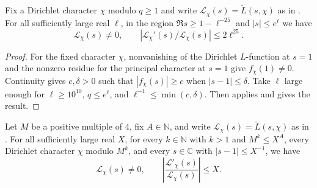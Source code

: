 \begin{lemma}
\label{lem:fixed-character-zero-free-region}
\emitthmsource
Fix a Dirichlet character $\chi$ modulo $q\ge1$ and write $\mathcal L_\chi(s)=\widetilde L(s,\chi)$ as in . For all sufficiently large real $\ell$, in the region
$\Re s\ge1-\ell^{-25}$ and $|s|\le e^\ell$ we have
\[
 \mathcal L_\chi(s)\ne0,\qquad
 |\mathcal L_\chi'(s)/\mathcal L_\chi(s)|\le2\ell^{25}.
\]
\end{lemma}

\begin{proof}
For the fixed character $\chi$, nonvanishing of the Dirichlet $L$-function at $s=1$ and the nonzero residue for the principal character at $s=1$ give $f_\chi(1)\ne0$. Continuity gives $c,\delta>0$ such that $|f_\chi(s)|\ge c$ when $|s-1|\le\delta$. Take $\ell$ large enough for $\ell\ge10^{10}$, $q\le e^\ell$, and $\ell^{-1}\le\min(c,\delta)$. Then  applies and gives the result.
\end{proof}

\begin{lemma}
\label{lem:prime-window-disc}
\emitthmsource
Let $M$ be a positive multiple of $4$, fix $A\in\mathbb N$, and write $\mathcal L_\chi(s)=\widetilde L(s,\chi)$ as in . For all sufficiently large real $X$, for every $k\in\mathbb N$ with $k>1$ and $M^k\le X^A$, every Dirichlet character $\chi$ modulo $M^k$, and every $s\in\mathbb C$ with $|s-1|\le X^{-1}$, we have
\[
 \mathcal L_\chi(s)\ne0,\qquad
 \left|\frac{\mathcal L'_\chi(s)}{\mathcal L_\chi(s)}\right|\le X .
\]
\end{lemma}

